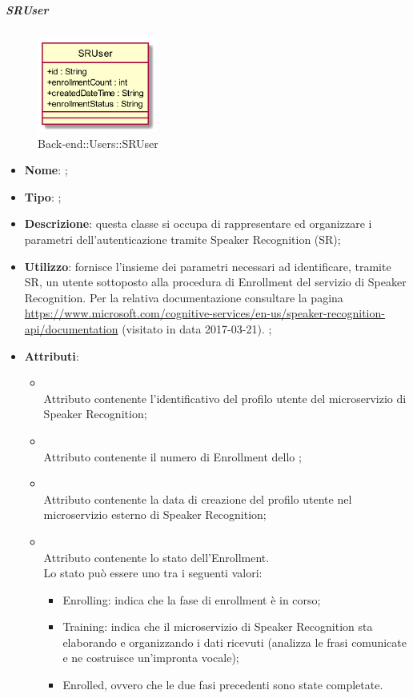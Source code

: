 \hypertarget{SRUser_label}{\subparagraph{SRUser}}
\begin{figure}[h]
	\centering
	\includegraphics[width=0.35\textwidth,height=\textheight,keepaspectratio]{images/ClassSRUser.png}
	\caption{Back-end::Users::SRUser}
\end{figure}
\begin{itemize}
	\item \textbf{Nome}: ;
	\item \textbf{Tipo}: ;
	\item \textbf{Descrizione}: questa classe si occupa di rappresentare ed organizzare i parametri dell'autenticazione tramite Speaker Recognition (SR);
	\item \textbf{Utilizzo}: fornisce l'insieme dei parametri necessari ad identificare, tramite SR, un utente sottoposto alla procedura di Enrollment del servizio di Speaker Recognition.
Per la relativa documentazione consultare la pagina \url{https://www.microsoft.com/cognitive-services/en-us/speaker-recognition-api/documentation}  (visitato in data 2017-03-21).
;
	\item \textbf{Attributi}:
	\begin{itemize}
		\item[]  \\
		Attributo contenente l'identificativo del profilo utente del microservizio di Speaker Recognition;
		\item[]  \\
		Attributo contenente il numero di Enrollment dello ;
		\item[]  \\
		Attributo contenente la data di creazione del profilo utente nel microservizio esterno di Speaker Recognition;
		\item[]  \\
		Attributo contenente lo stato dell'Enrollment.\\
Lo stato può essere uno tra i seguenti valori:
\begin{itemize} \item Enrolling: indica che la fase di enrollment è in corso; \item Training: indica che il microservizio di Speaker Recognition sta elaborando e organizzando i dati ricevuti (analizza le frasi comunicate e ne costruisce un'impronta vocale); \item Enrolled, ovvero che le due fasi precedenti sono state completate. \end{itemize}

\end{itemize}
\end{itemize}
